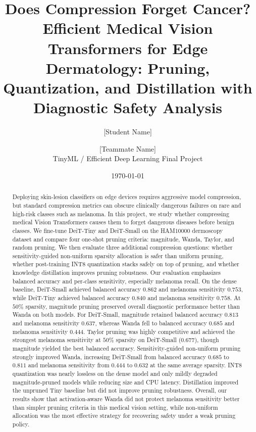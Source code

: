 \documentclass[11pt]{article}
\title{Does Compression Forget Cancer?\\
\large Efficient Medical Vision Transformers for Edge Dermatology: Pruning, Quantization, and Distillation with Diagnostic Safety Analysis}
\author{
[Student Name] \and [Teammate Name] \\
\small TinyML / Efficient Deep Learning Final Project
}
\date{\today}
\begin{document}
\maketitle

\begin{abstract}
Deploying skin-lesion classifiers on edge devices requires aggressive model compression, but standard compression metrics can obscure clinically dangerous failures on rare and high-risk classes such as melanoma. In this project, we study whether compressing medical Vision Transformers causes them to forget dangerous diseases before benign classes. We fine-tune DeiT-Tiny and DeiT-Small on the HAM10000 dermoscopy dataset and compare four one-shot pruning criteria: magnitude, Wanda, Taylor, and random pruning. We then evaluate three additional compression questions: whether sensitivity-guided non-uniform sparsity allocation is safer than uniform pruning, whether post-training INT8 quantization stacks safely on top of pruning, and whether knowledge distillation improves pruning robustness. Our evaluation emphasizes balanced accuracy and per-class sensitivity, especially melanoma recall. On the dense baseline, DeiT-Small achieved balanced accuracy $0.862$ and melanoma sensitivity $0.753$, while DeiT-Tiny achieved balanced accuracy $0.840$ and melanoma sensitivity $0.758$. At $50\%$ sparsity, magnitude pruning preserved overall diagnostic performance better than Wanda on both models. For DeiT-Small, magnitude retained balanced accuracy $0.813$ and melanoma sensitivity $0.637$, whereas Wanda fell to balanced accuracy $0.685$ and melanoma sensitivity $0.444$. Taylor pruning was highly competitive and achieved the strongest melanoma sensitivity at $50\%$ sparsity on DeiT-Small ($0.677$), though magnitude yielded the best balanced accuracy. Sensitivity-guided non-uniform pruning strongly improved Wanda, increasing DeiT-Small from balanced accuracy $0.685$ to $0.811$ and melanoma sensitivity from $0.444$ to $0.632$ at the same average sparsity. INT8 quantization was nearly lossless on the dense model and only mildly degraded magnitude-pruned models while reducing size and CPU latency. Distillation improved the unpruned Tiny baseline but did not improve pruning robustness. Overall, our results show that activation-aware Wanda did not protect melanoma sensitivity better than simpler pruning criteria in this medical vision setting, while non-uniform allocation was the most effective strategy for recovering safety under a weak pruning policy.
\end{abstract}
\end{document}
